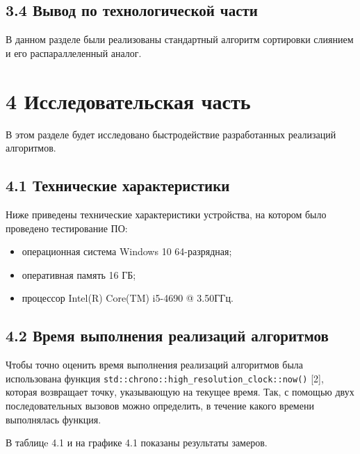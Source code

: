 \documentclass[12pt, a4paper]{report}
\begin{document}
\section*{3.4 Вывод по технологической части}

В данном разделе были реализованы стандартный алгоритм сортировки слиянием и его распараллеленный аналог.

\chapter*{4 Исследовательская часть}

В этом разделе будет исследовано быстродействие разработанных реализаций алгоритмов.

\section*{4.1 Технические характеристики}

Ниже приведены технические характеристики устройства, на котором было проведено тестирование ПО:

\begin{itemize}
	\item операционная система Windows 10 64-разрядная;
	\item оперативная память 16 ГБ;
	\item процессор Intel(R) Core(TM) i5-4690 @ 3.50ГГц.
\end{itemize}

\section*{4.2 Время выполнения реализаций алгоритмов}

Чтобы точно оценить время выполнения реализаций алгоритмов была использована функция \verb|std::chrono::high_resolution_clock::now()| [2], которая возвращает точку, указывающую на текущее время. Так, с помощью двух последовательных вызовов можно определить, в течение какого времени выполнялась функция.

В таблицe 4.1 и на графике 4.1 показаны результаты замеров.
\end{document}
